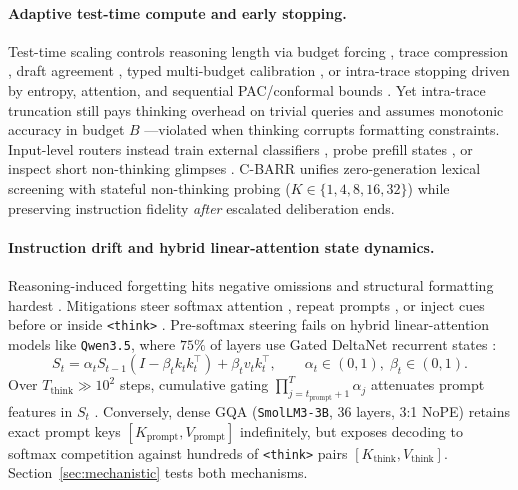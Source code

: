 \documentclass{article}
\begin{document}
\paragraph{Adaptive test-time compute and early stopping.}
Test-time scaling controls reasoning length via budget forcing \cite{muennighoff2025s1,ma2025nothinking}, trace compression \cite{lorup2026concise9b}, draft agreement \cite{lee2026dart}, typed multi-budget calibration \cite{ding2026thinkjev}, or intra-trace stopping driven by entropy, attention, and sequential PAC/conformal bounds \cite{yan2026entrocut,xie2026statstop,li2026asag,zeng2025pac,yu2026bpac,wang2026conformal}. Yet intra-trace truncation still pays thinking overhead on trivial queries and assumes monotonic accuracy in budget $B$ \cite{aggarwal2025optimalthinkingbench,nguyen2026early}---violated when thinking corrupts formatting constraints. Input-level routers instead train external classifiers \cite{li2025pitfalls,yu2026hdm}, probe prefill states \cite{li2026sonata,varshney2026llmrouter,milios2026scout}, or inspect short non-thinking glimpses \cite{tan2025zerostep,xia2026edrm,ning2026hrbench,zeng2026glimprouter}. C-BARR unifies zero-generation lexical screening with stateful non-thinking probing ($K \in \{1, 4, 8, 16, 32\}$) while preserving instruction fidelity \emph{after} escalated deliberation ends.

\paragraph{Instruction drift and hybrid linear-attention state dynamics.}
Reasoning-induced forgetting hits negative omissions and structural formatting hardest \cite{li2025pitfalls,kwon2025reasonif,kumar2026constraint,gamage2026omission,kariyappa2026hierarchy,dong2025ifevalpp}. Mitigations steer softmax attention \cite{venkateswaran2026spotlight}, repeat prompts \cite{leviathan2025promptrep}, or inject cues before or inside \texttt{<think>} \cite{wu2025intervention,li2026thinkpilot,zhao2026bridging}. Pre-softmax steering fails on hybrid linear-attention models like \texttt{Qwen3.5}, where $75\%$ of layers use Gated DeltaNet recurrent states \cite{yang2024gateddeltanet,zeng2026linearquery}:
\begin{equation}
\label{eq:deltanet}
S_t = \alpha_t S_{t-1}\!\left(I - \beta_t k_t k_t^\top\right) + \beta_t v_t k_t^\top, \qquad \alpha_t \in (0, 1), \; \beta_t \in (0, 1).
\end{equation}
Over $T_{\text{think}} \gg 10^2$ steps, cumulative gating $\prod_{j=t_{\text{prompt}}+1}^{T} \alpha_j$ attenuates prompt features in $S_t$ \cite{zhou2026amnesia}. Conversely, dense GQA (\texttt{SmolLM3-3B}, 36 layers, 3:1 NoPE) retains exact prompt keys $[K_{\text{prompt}}, V_{\text{prompt}}]$ indefinitely, but exposes decoding to softmax competition against hundreds of \texttt{<think>} pairs $[K_{\text{think}}, V_{\text{think}}]$. Section~\ref{sec:mechanistic} tests both mechanisms.
\end{document}
